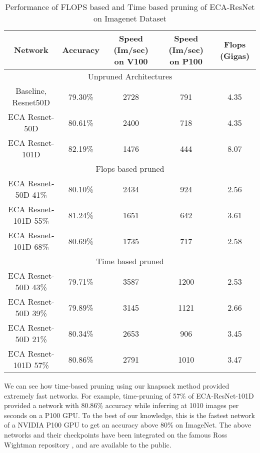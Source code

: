 \documentclass{article}
\begin{document}
\begin{table}[H]
  \caption{
  Performance of FLOPS based and Time based pruning of ECA-ResNet on Imagenet Dataset
  }
  \centering
\begin{tabular}{c c c c c}
    \toprule
 Network
&
Accuracy 
&
Speed (Im/sec) on V100
&
Speed (Im/sec) on P100
&
Flops (Gigas) \\
\midrule
\multicolumn{5}{c}{Unpruned Architectures}\\
    \midrule
Baseline, Resnet50D
&
79.30\%
&
2728
&
791
&
4.35\\
\midrule

ECA Resnet-50D
&
80.61\%
&
2400
&
718
&
4.35\\
\midrule

ECA Resnet-101D
&
82.19\%
&
1476
&
444
&
8.07\\
\midrule

\multicolumn{5}{c}{Flops based pruned}\\
\midrule


ECA Resnet-50D 41\%
&
80.10\%
&
2434
&
924
&
2.56\\
\midrule


ECA Resnet-101D 55\%
&
81.24\%
&
1651
&
642
&
3.61\\
\midrule


ECA Resnet-101D 68\%
&
80.69\%
&
1735
&
717
&
2.58\\
\midrule

\multicolumn{5}{c}{Time based pruned}\\
 \midrule
ECA Resnet-50D 43\%
&
79.71\%
&
3587
&
1200
&
2.53\\
\midrule


ECA Resnet-50D 39\%
&
79.89\%
&
3145
&
1121
&
2.66\\
\midrule


ECA Resnet-50D 21\%
&
80.34\%
&
2653
&
906
&
3.45\\
\midrule


ECA Resnet-101D 57\%
&
80.86\%
&
2791
&
1010
&
3.47\\

    \bottomrule
  \end{tabular}
  \label{table:ECA}
\end{table}

We can see how time-based pruning using our knapsack method provided extremely fast networks. For example, time-pruning of 57\% of ECA-ResNet-101D provided a network with 80.86\% accuracy while inferring at 1010 images per seconds on a P100 GPU. To the best of our knowledge, this is the fastest network of a NVIDIA P100 GPU to get an accuracy above 80\% on ImageNet. The above networks and their checkpoints have been integrated on the famous Ross Wightman repository \cite{rwightman}, and are available to the public. 
\end{document}
